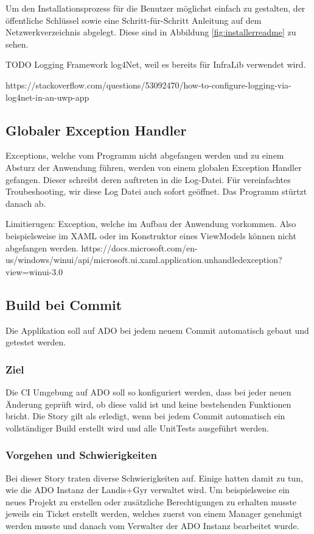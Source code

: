 Um den Installationsprozess für die Benutzer möglichst einfach zu gestalten, der öffentliche Schlüssel sowie eine Schritt-für-Schritt Anleitung auf dem Netzwerkverzeichnis abgelegt.
Diese sind in Abbildung \ref{fig:installerreadme} zu sehen.

TODO
Logging Framework
log4Net, weil es bereits für InfraLib verwendet wird. 

https://stackoverflow.com/questions/53092470/how-to-configure-logging-via-log4net-in-an-uwp-app

\subsection{Globaler Exception Handler}

Exceptions, welche vom Programm nicht abgefangen werden und zu einem Absturz der Anwendung führen, werden von einem globalen Exception Handler gefangen.
Dieser schreibt deren auftreten in die Log-Datei. Für vereinfachtes Troubeshooting, wir diese Log Datei auch sofort geöffnet. Das Programm stürtzt danach ab.

Limitierugen:
Exception, welche im Aufbau der Anwendung vorkommen. Also beispielsweise im XAML oder im Konstruktor eines ViewModels können nicht abgefangen werden.
https://docs.microsoft.com/en-us/windows/winui/api/microsoft.ui.xaml.application.unhandledexception?view=winui-3.0


\subsection{Build bei Commit}\label{story_buildoncommit}
\dq Die Applikation soll auf \ac{ADO} bei jedem neuem Commit automatisch gebaut und getestet werden.\dq

\subsubsection{Ziel}
Die \ac{CI} Umgebung auf \ac{ADO} soll so konfiguriert werden, dass bei jeder neuen Änderung geprüft wird, ob diese valid ist und keine bestehenden Funktionen bricht.
Die Story gilt als erledigt, wenn bei jedem Commit automatisch ein vollständiger Build erstellt wird und alle UnitTests ausgeführt werden.

\subsubsection{Vorgehen und Schwierigkeiten}
Bei dieser Story traten diverse Schwierigkeiten auf.
Einige hatten damit zu tun, wie die \ac{ADO} Instanz der Landis+Gyr verwaltet wird.
Um beispielsweise ein neues Projekt zu erstellen oder zusätzliche Berechtigungen zu erhalten musste jeweils ein Ticket erstellt werden, welches zuerst von einem Manager genehmigt werden musste und danach vom Verwalter der \ac{ADO} Instanz bearbeitet wurde.


